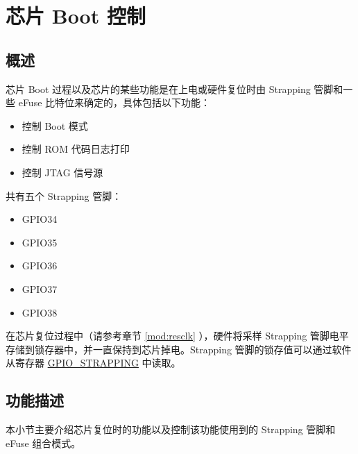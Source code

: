 \documentclass[main\_\_CN.tex]{subfiles}
\begin{document}

\ifglobal
\else
    {\let\clearpage\relax \listoftodos}
    {\let\clearpage\relax \listofdonetodos}
    \tableofcontents
\fi



\hypertarget{bootctrl}{}
\chapter{芯片 Boot 控制}
\label{mod:bootctrl}
\section{概述}

芯片 Boot 过程以及芯片的某些功能是在上电或硬件复位时由 Strapping 管脚和一些 eFuse 比特位来确定的，具体包括以下功能：

\begin{itemize}
    \item 控制 Boot 模式
    \item 控制 ROM 代码日志打印
    \item 控制 JTAG 信号源
\end{itemize}

\chipname{} 共有五个 Strapping 管脚：
\begin{itemize}
    \item GPIO34
    \item GPIO35
    \item GPIO36
    \item GPIO37
    \item GPIO38
\end{itemize}

在芯片复位过程中（请参考章节 \ref{mod:resclk} \textit{}），硬件将采样 Strapping 管脚电平存储到锁存器中，并一直保持到芯片掉电。Strapping 管脚的锁存值可以通过软件从寄存器 \hyperref[fielddesc:GPIOSTRAPPING]{GPIO\_STRAPPING}
中读取。

\section{功能描述}
本小节主要介绍芯片复位时的功能以及控制该功能使用到的 Strapping 管脚和 eFuse 组合模式。
\end{document}
